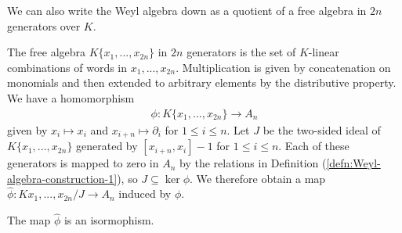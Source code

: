 We can also write the Weyl algebra down as a quotient of a free algebra in $2n$ generators over $K$.

\begin{defn}\label{defn:Weyl-algebra-construction-2}
	The free algebra $K\{x_1,...,x_{2n}\}$ in $2n$ generators is the set of $K$-linear combinations of words in $x_1,...,x_{2n}$. Multiplication is given by concatenation on monomials and then extended to arbitrary elements by the distributive property. We have a homomorphism
	\begin{align*}
		\phi:K\{x_1,...,x_{2n}\} \to A_n
	\end{align*}
	given by $x_i \mapsto x_i$ and $x_{i+n} \mapsto \partial_i$ for $1\leq i\leq n$. Let $J$ be the two-sided ideal of  $K\{x_1,...,x_{2n}\}$ generated by $[x_{i+n},x_i] - 1$ for $1\leq i\leq n$. Each of these generators is mapped to zero in $A_n$ by the relations in Definition (\ref{defn:Weyl-algebra-construction-1}), so $J \subseteq \ker \phi$. We therefore obtain a map $\hat{\phi}:K{x_1,...,x_{2n}}/J\to A_n$ induced by $\phi$.
\end{defn}

\begin{thm}\label{thm:Weyl-constructions-iso}
	The map $\hat{\phi}$ is an isormophism.
\end{thm}

